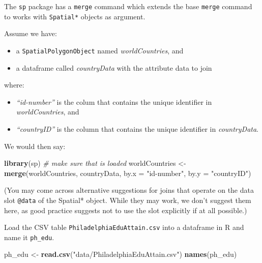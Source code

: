 \documentclass[]{book}
\newenvironment{Shaded}{\begin{snugshade}}{\end{snugshade}}
\newcommand{\KeywordTok}[1]{\textcolor[rgb]{0.13,0.29,0.53}{\textbf{#1}}}
\newcommand{\DataTypeTok}[1]{\textcolor[rgb]{0.13,0.29,0.53}{#1}}
\newcommand{\StringTok}[1]{\textcolor[rgb]{0.31,0.60,0.02}{#1}}
\newcommand{\CommentTok}[1]{\textcolor[rgb]{0.56,0.35,0.01}{\textit{#1}}}
\newcommand{\NormalTok}[1]{#1}
\providecommand{\tightlist}{%
  \setlength{\itemsep}{0pt}\setlength{\parskip}{0pt}}
\theoremstyle{definition}
\theoremstyle{definition}
\theoremstyle{definition}
\theoremstyle{remark}
\begin{document}
The \texttt{sp} package has a \texttt{merge} command which extends the
base \texttt{merge} command to works with \texttt{Spatial*} objects as
argument.

Assume we have:

\begin{itemize}
\tightlist
\item
  a \texttt{SpatialPolygonObject} named \emph{worldCountries}, and
\item
  a dataframe called \emph{countryData} with the attribute data to join
\end{itemize}

where:

\begin{itemize}
\tightlist
\item
  \emph{``id-number''} is the colum that contains the unique identifier
  in \emph{worldCountries}, and
\item
  \emph{``countryID''} is the column that contains the unique identifier
  in \emph{countryData}.
\end{itemize}

We would then say:

\begin{Shaded}
\begin{Highlighting}[]
\KeywordTok{library}\NormalTok{(sp) }\CommentTok{# make sure that is loaded}
\NormalTok{worldCountries <-}\StringTok{ }\KeywordTok{merge}\NormalTok{(worldCountries, countryData, }\DataTypeTok{by.x =} \StringTok{"id-number"}\NormalTok{, }\DataTypeTok{by.y =} \StringTok{"countryID"}\NormalTok{)}
\end{Highlighting}
\end{Shaded}

(You may come across alternative suggestions for joins that operate on
the data slot \texttt{@data} of the Spatial* object. While they may
work, we don't suggest them here, as good practice suggests not to use
the slot explicitly if at all possible.)

Load the CSV table \texttt{PhiladelphiaEduAttain.csv} into a dataframe
in R and name it \texttt{ph\_edu}.

\begin{Shaded}
\begin{Highlighting}[]
\NormalTok{ph_edu <-}\StringTok{ }\KeywordTok{read.csv}\NormalTok{(}\StringTok{"data/PhiladelphiaEduAttain.csv"}\NormalTok{)}
\KeywordTok{names}\NormalTok{(ph_edu)}
\end{Highlighting}
\end{Shaded}
\end{document}
